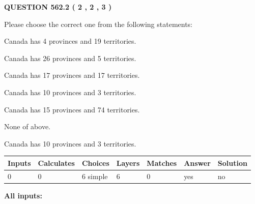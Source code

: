 \documentclass[12pt]{article}
\begin{document}
   
  
\vspace{0.2in}
  
{\textbf{\Large{QUESTION
562.2 
 ( 2 , 2 , 3 )
}}}
  
  
Please choose the correct one from the following statements:
 
 
Canada has   4 provinces and  19 territories.
 
 
Canada has  26 provinces and  5 territories.
 
 
Canada has  17 provinces and  17 territories.
 
 
Canada has 10  provinces and 3 territories.
 
 
Canada has  15 provinces and  74 territories.
 
 
 None of above.
 
 
\noindent{}
 
 
Canada has 10  provinces and 3 territories.
 
 
\noindent{}
 
 
   
   
   
   
\noindent\begin{tabular}{|l|l|l|l|l|l|l|}
 \hline
Inputs & Calculates & Choices & Layers & Matches & Answer & Solution \\ \hline
 0  & 
 0  & 
 6
  simple  
  & 
 6  & 
 0  & 
  yes & 
  no 
  \\ \hline
 \end{tabular}
   
   
   
   
\noindent{}
   
   
   
   
\noindent\vspace{0.1in}\hspace{-0.08in} {\textbf{\Large{All inputs: }}}
   
   
   
   
   
   
 \vspace{0.2in}
 
\end{document}
